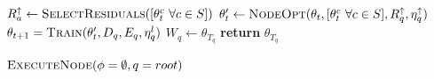\begin{algorithm}[H]
\begin{onehalfspace}
\begin{algorithmic}[1]
            \EndFor

             \label{alg:B-HFL:line:13}
            \State $ R^\uparrow_a \gets \Call{SelectResiduals}{[\theta^c_t \,\, \forall c \in S]}$ \label{alg:B-HFL:line:14}
            \EndFor
            \State $\theta_t^\prime \gets \Call{NodeOpt}{\theta_t, [\theta^c_t \,\, \forall c \in S], R^\uparrow_q, \eta^{\uparrow}_q}  $  \label{alg:B-HFL:line:15}
            \State $\theta_{t+1} = \Call{Train}{\theta_{t}^\prime,D_q,  E_q, \eta^l_q}$  \label{alg:B-HFL:line:7}
            \EndFor
            \State $W_q \gets \theta_{T_q}$  \label{alg:B-HFL:line:16}
            \State \textbf{return} $\theta_{T_q}$ \label{alg:B-HFL:line:17}
            \EndProcedure

            \State $\Call{ExecuteNode}{\phi = \emptyset, q = root}$
        \end{algorithmic}
    \end{onehalfspace}
\end{algorithm}


